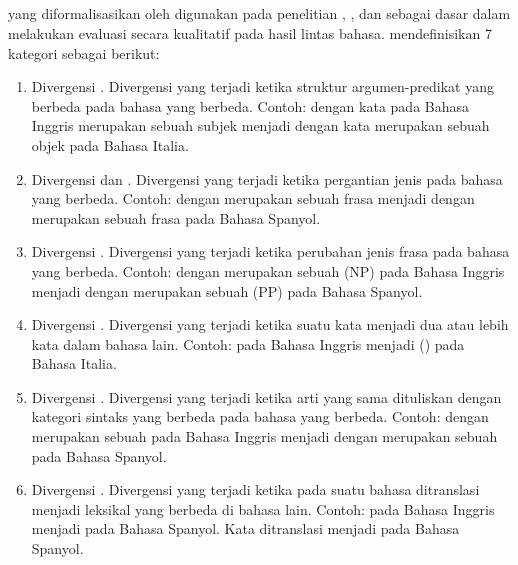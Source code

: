 \subsection{\Transdiver{}}

\Transdiver{} yang diformalisasikan oleh \textcite{dorr1994} digunakan pada penelitian \textcite{damonte2018}, \textcite{blloshmi2020}, dan \textcite{putra2022} sebagai dasar dalam melakukan evaluasi secara kualitatif pada hasil \amrparsing{} lintas bahasa.
\textcite{blloshmi2020} mendefinisikan 7 kategori \transdiver{} sebagai berikut:
\begin{enumerate}
  \item Divergensi .
  Divergensi yang terjadi ketika struktur argumen-predikat yang berbeda pada bahasa yang berbeda.
  Contoh:  dengan kata  pada Bahasa Inggris merupakan sebuah subjek menjadi  dengan kata  merupakan sebuah objek pada Bahasa Italia.

  \item Divergensi  dan .
  Divergensi yang terjadi ketika pergantian jenis  pada bahasa yang berbeda.
  Contoh:  dengan  merupakan sebuah frasa  menjadi  dengan  merupakan sebuah frasa  pada Bahasa Spanyol.

  \item Divergensi .
  Divergensi yang terjadi ketika perubahan jenis frasa pada bahasa yang berbeda.
  Contoh:  dengan  merupakan sebuah  (NP) pada Bahasa Inggris menjadi  dengan  merupakan sebuah  (PP) pada Bahasa Spanyol.

  \item Divergensi .
  Divergensi yang terjadi ketika suatu kata menjadi dua atau lebih kata dalam bahasa lain.
  Contoh:  pada Bahasa Inggris menjadi  () pada Bahasa Italia.

  \item Divergensi .
  Divergensi yang terjadi ketika arti yang sama dituliskan dengan kategori sintaks yang berbeda pada bahasa yang berbeda.
  Contoh:  dengan  merupakan sebuah  pada Bahasa Inggris menjadi  dengan  merupakan sebuah  pada Bahasa Spanyol.

  \item Divergensi .
  Divergensi yang terjadi ketika  pada suatu bahasa ditranslasi menjadi  leksikal yang berbeda di bahasa lain.
  Contoh:  pada Bahasa Inggris menjadi  pada Bahasa Spanyol. Kata  ditranslasi menjadi  pada Bahasa Spanyol.
\end{enumerate}
